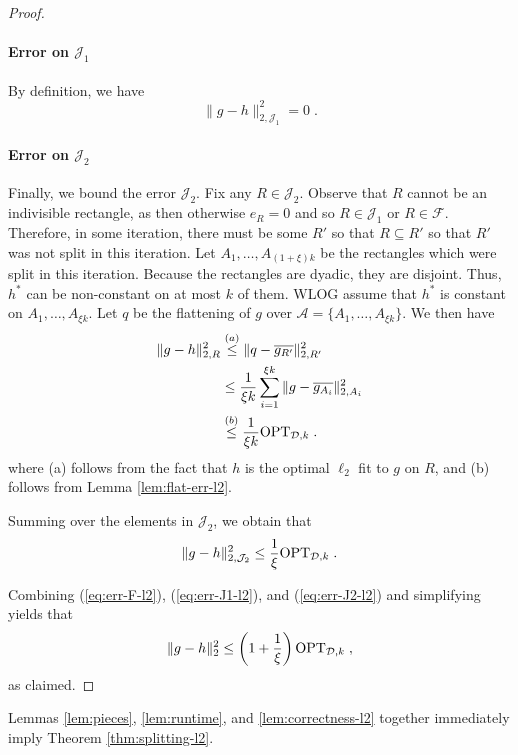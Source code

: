 \documentclass[final,12pt]{colt2018} %
\newcommand{\flatten}[1]{\overline{#1}}
\newcommand{\hier}{\mathcal{D}}
\newcommand{\calF}{\mathcal{F}}
\newcommand{\calJ}{\mathcal{J}}
\begin{document}
\begin{proof}
\paragraph{Error on $\calJ_1$}
By definition, we have
\begin{equation}
\label{eq:err-J1-l2}
\| g - h \|_{2, \calJ_1}^2 = 0 \; .
\end{equation}

\paragraph{Error on $\calJ_2$}
Finally, we bound the error $\calJ_2$.
Fix any $R \in \calJ_2$.
Observe that $R$ cannot be an indivisible rectangle, as then otherwise $e_R = 0$ and so $R \in \calJ_1$ or $R \in \calF$.
Therefore, in some iteration, there must be some $R'$ so that $R \subseteq R'$ so that $R'$ was not split in this iteration.
Let $A_1, \ldots, A_{(1 + \xi) k}$ be the rectangles which were split in this iteration.
Because the rectangles are dyadic, they are disjoint.
Thus, $h^*$ can be non-constant on at most $k$ of them.
WLOG assume that $h^*$ is constant on $A_1, \ldots, A_{\xi k}$.
Let $q$ be the flattening of $g$ over $\mathcal{A} = \{ A_1, \ldots, A_{\xi k} \}$.
We then have
\begin{align*}
\| g - h \|_{2, R}^2 &\stackrel{(a)}{\leq} \| q - \flatten{g_{R'}} \|_{2, R'}^2 \\
&\leq \frac{1}{\xi k} \sum_{i = 1}^{\xi k} \| g - \flatten{g_{A_i}} \|_{2, A_i}^2 \\
&\stackrel{(b)}{\leq} \frac{1}{\xi k} \OPT_{\hier, k} \; .
\end{align*}
where (a) follows from the fact that $h$ is the optimal $\ell_2$ fit to $g$ on $R$, and (b) follows from Lemma \ref{lem:flat-err-l2}.

Summing over the elements in $\calJ_2$, we obtain that 
\begin{equation}
\label{eq:err-J2-l2}
\| g - h \|_{2, \calJ_2}^2 \leq \frac{1}{\xi} \OPT_{\hier, k} \; .
\end{equation}

Combining (\ref{eq:err-F-l2}), (\ref{eq:err-J1-l2}), and (\ref{eq:err-J2-l2}) and simplifying yields that
\[
\| g - h \|_{2}^2 \leq \left( 1 + \frac{1}{\xi} \right) \OPT_{\hier, k}  \; ,
\]
as claimed.
\end{proof}
\noindent 
Lemmas \ref{lem:pieces}, \ref{lem:runtime}, and \ref{lem:correctness-l2} together immediately imply Theorem \ref{thm:splitting-l2}.
\end{document}
